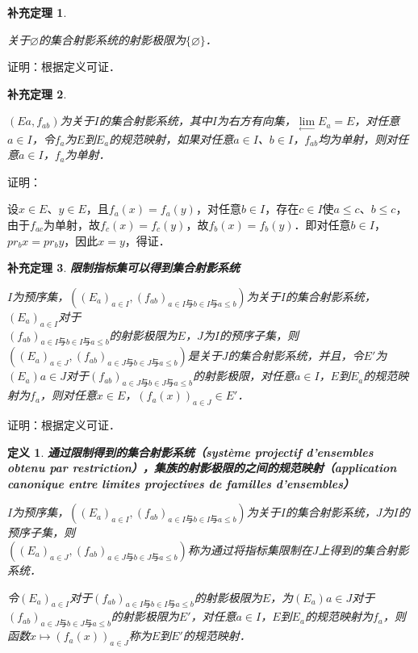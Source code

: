 \documentclass[12pt, a4paper, oneside]{book}
\newtheorem{cor}{补充定理}
\newtheorem{de}{定义}
\begin{document}
			\begin{cor}\label{cor413}
				\hfill\par
				关于$\varnothing$的集合射影系统的射影极限为$\{\varnothing\}$．
			\end{cor}
			证明：根据定义可证．
			
			\begin{cor}\label{cor414}
				\hfill\par
				$(Ea, f_{ab})$为关于$I$的集合射影系统，其中$I$为右方有向集，$\lim\limits_\gets E_a=E$，对任意$a\in I$，令$f_a$为$E$到$E_a$的规范映射，如果对任意$a\in I$、$b\in I$，$f_{ab}$均为单射，则对任意$a\in I$，$f_a$为单射．
			\end{cor}
			证明：
			\par
			设$x\in E$、$y\in E$，且$f_a(x)=f_a(y)$，对任意$b\in I$，存在$c\in I$使$a\leq c$、$b\leq c$，由于$f_{ac}$为单射，故$f_c(x)=f_c(y)$，故$f_b(x)=f_b(y)$．即对任意$b\in I$，$pr_bx=pr_by$，因此$x=y$，得证．
			
			\begin{cor}\label{cor415}
				\textbf{限制指标集可以得到集合射影系统}
				\par
				$I$为预序集，$((E_a)_{a\in I}, (f_{ab})_{a\in I\text{与}b\in I\text{与}a\leq b})$为关于$I$的集合射影系统，$(E_a)_{a\in I}$对于\\$(f_{ab})_{a\in I\text{与}b\in I\text{与}a\leq b}$的射影极限为$E$，$J$为$I$的预序子集，则$((E_a)_{a\in J}, (f_{ab})_{a\in J\text{与}b\in J\text{与}a\leq b})$是关于$J$的集合射影系统，并且，令$E'$为$(E_a){a\in J}$对于$(f_{ab})_{a\in J\text{与}b\in J\text{与}a\leq b}$的射影极限，对任意$a\in I$，$E$到$E_a$的规范映射为$f_a$，则对任意$x\in E$，$(f_a(x))_{a\in J}\in E'$．
			\end{cor}
			证明：根据定义可证．
			
			\begin{de}
				\textbf{通过限制得到的集合射影系统（système projectif d'ensembles obtenu par restriction），集族的射影极限的之间的规范映射（application canonique entre limites projectives de familles d'ensembles）}
				\par
				$I$为预序集，$((E_a)_{a\in I}, (f_{ab})_{a\in I\text{与}b\in I\text{与}a\leq b})$为关于$I$的集合射影系统，$J$为$I$的预序子集，则\\$((E_a)_{a\in J}, (f_{ab})_{a\in J\text{与}b\in J\text{与}a\leq b})$称为通过将指标集限制在$J$上得到的集合射影系统．
				\par
				令$(E_a)_{a\in I}$对于$(f_{ab})_{a\in I\text{与}b\in I\text{与}a\leq b}$的射影极限为$E$，为$(E_a){a\in J}$对于$(f_{ab})_{a\in J\text{与}b\in J\text{与}a\leq b}$的射影极限为$E'$，对任意$a\in I$，$E$到$E_a$的规范映射为$f_a$，则函数$x\mapsto (f_a(x))_{a\in J}$称为$E$到$E'$的规范映射．
			\end{de}
			
\end{document}
